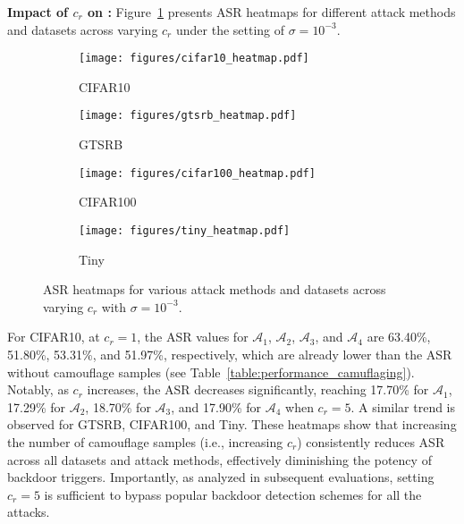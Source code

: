 \vspace{0.15cm}
\noindent \textbf{Impact of $c_{r}$ on \methodname:} Figure~\ref{fig:asr_heatmap} presents ASR heatmaps for different attack methods and datasets across varying $c_{r}$ under the setting of $\sigma = 10^{-3}$. 
\begin{figure}[!t]
    \centering
    \begin{subfigure}{0.48\linewidth}
        \centering
        \texttt{[image: figures/cifar10\_heatmap.pdf]}
        \caption{CIFAR10}
    \end{subfigure}\hspace{0.1cm}
    \begin{subfigure}{0.48\linewidth}
        \centering
        \texttt{[image: figures/gtsrb\_heatmap.pdf]}
        \caption{GTSRB}
    \end{subfigure}
    \begin{subfigure}{0.48\linewidth}
        \centering
        \texttt{[image: figures/cifar100\_heatmap.pdf]}
        \caption{CIFAR100}
    \end{subfigure}\hspace{0.1cm}
    \begin{subfigure}{0.48\linewidth}
        \centering
        \texttt{[image: figures/tiny\_heatmap.pdf]}
        \caption{Tiny}
    \end{subfigure}
    \caption{ASR heatmaps for various attack methods and datasets across varying $c_{r}$ with $\sigma = 10^{-3}$.}
    \label{fig:asr_heatmap}
\end{figure}
For CIFAR10, at $c_{r}=1$, the ASR values for $\mathcal{A}_1$, $\mathcal{A}_2$, $\mathcal{A}_3$, and $\mathcal{A}_4$ are 63.40\%, 51.80\%, 53.31\%, and 51.97\%, respectively, which are already lower than the ASR without camouflage samples (see Table~\ref{table:performance_camuflaging}). Notably, as $c_{r}$ increases, the ASR decreases significantly, reaching 17.70\% for $\mathcal{A}_1$, 17.29\% for $\mathcal{A}_2$, 18.70\% for $\mathcal{A}_3$, and 17.90\% for $\mathcal{A}_4$ when $c_{r} = 5$. A similar trend is observed for GTSRB, CIFAR100, and Tiny. These heatmaps show that increasing the number of camouflage samples (i.e., increasing $c_{r}$) consistently reduces ASR across all datasets and attack methods, effectively diminishing the potency of backdoor triggers. Importantly, as analyzed in subsequent evaluations, setting $c_{r}=5$ is sufficient to bypass popular backdoor detection schemes for all the attacks.

